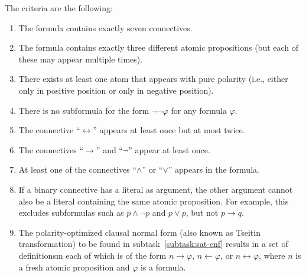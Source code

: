 The criteria are the following:
\begin{enumerate}
    \item
        The formula contains exactly seven connectives.
    \item
        The formula contains exactly three different atomic propositions
        (but each of these may appear multiple times).
    \item\label{item:polarity}
        There exists at least one atom that appears with pure polarity
        (i.e., either only in positive position or only in negative position).
    \item
        There is no subformula for the form $\lnot \lnot \varphi$ for any formula $\varphi$.
    \item
        The connective ``$\leftrightarrow$'' appears at least once but at most twice.
    \item
        The connectives ``$\rightarrow$'' and ``$\lnot$'' appear at least once.
    \item
        At least one of the connectives ``$\land$'' or ``$\lor$'' appears in the formula.
    \item
        If a binary connective has a literal as argument,
        the other argument cannot also be a literal containing the same atomic proposition.
        For example, this excludes subformulas such as $p \land \lnot p$ and $p \lor p$,
        but not $p \rightarrow q$.
    \item
        The polarity-optimized clausal normal form
        (also known as Tseitin transformation)
        to be found in subtask~\ref{subtask:sat-cnf} results in a set of definitionsm
        each of which is of the form
        $n \rightarrow \varphi$,
        $n \leftarrow \varphi$, or
        $n \leftrightarrow \varphi$,
        where $n$ is a fresh atomic proposition and $\varphi$ is a formula.

\end{enumerate}
